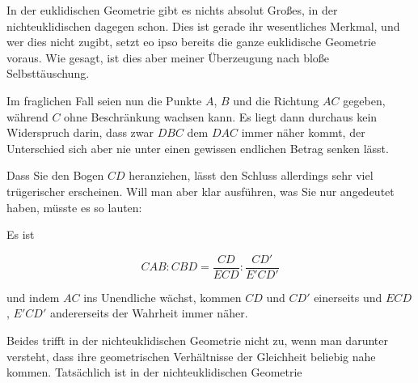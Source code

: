 %
In der euklidischen Geometrie gibt es nichts absolut Großes, in der nichteuklidischen dagegen schon. Dies ist gerade ihr wesentliches Merkmal, und wer dies nicht zugibt, setzt eo ipso bereits die ganze euklidische Geometrie voraus. Wie gesagt, ist dies aber meiner Überzeugung nach bloße Selbsttäuschung.

Im fraglichen Fall seien nun die Punkte $A$, $B$ und die Richtung $AC$ gegeben, während $C$ ohne Beschränkung wachsen kann. Es liegt dann durchaus kein Widerspruch darin, dass zwar $DBC$ dem $DAC$ immer näher kommt, der Unterschied sich aber nie unter einen gewissen endlichen Betrag senken lässt.

\begin{center}

\end{center}

\Needspace{9cm}
 Dass Sie den Bogen $CD$ heranziehen, lässt den Schluss allerdings sehr viel trügerischer erscheinen. Will man aber klar ausführen, was Sie nur angedeutet haben, müsste es so lauten:

\begin{center}

\end{center}

Es ist

\[
CAB:CBD=\frac{CD}{ECD}:\frac{CD'}{E'CD'}
\]

\noindent und indem $AC$ ins Unendliche wächst, kommen $CD$ und $CD'$ einerseits und $ECD$, $E'CD'$ andererseits der Wahrheit immer näher.

Beides trifft in der nichteuklidischen Geometrie nicht zu, wenn man darunter versteht, dass ihre geometrischen Verhältnisse der Gleichheit beliebig nahe kommen. Tatsächlich ist in der nichteuklidischen Geometrie
